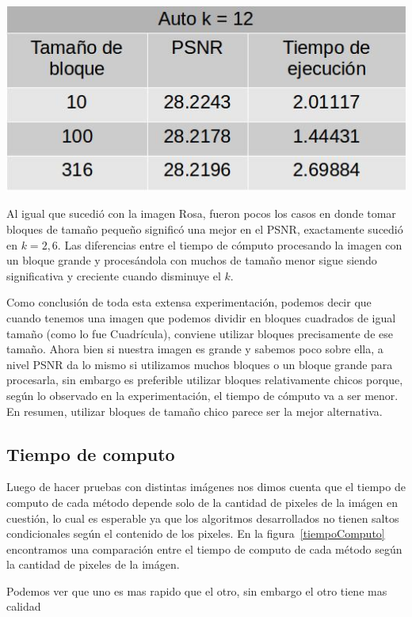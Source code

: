 \documentclass[a4paper]{article}
\begin{document}
\centerline{
\includegraphics[scale=0.5]{imagenes/autok12Tabla.jpg}
}

Al igual que sucedió con la imagen Rosa, fueron pocos los casos en donde tomar bloques de tamaño pequeño significó una mejor en el PSNR, exactamente sucedió en $k = 2, 6$. Las diferencias entre el tiempo de cómputo procesando la imagen con un bloque grande y procesándola con muchos de tamaño menor sigue siendo significativa y creciente cuando disminuye el $k$.
\par Como conclusión de toda esta extensa experimentación, podemos decir que cuando tenemos una imagen que podemos dividir en bloques cuadrados de igual tamaño (como lo fue Cuadrícula), conviene utilizar bloques precisamente de ese tamaño. Ahora bien si nuestra imagen es grande y sabemos poco sobre ella, a nivel PSNR da lo mismo si utilizamos muchos bloques o un bloque grande para procesarla, sin embargo es preferible utilizar bloques relativamente chicos porque, según lo observado en la experimentación, el tiempo de cómputo va a ser menor. En resumen, utilizar bloques de tamaño chico parece ser la mejor alternativa.


\subsection{Tiempo de computo}

Luego de hacer pruebas con distintas imágenes nos dimos cuenta que el tiempo de computo de cada método depende solo de la cantidad de pixeles de la imágen en cuestión, lo cual es esperable ya que los algoritmos desarrollados no tienen saltos condicionales según el contenido de los pixeles. En la figura~\ref{tiempoComputo} encontramos una comparación entre el tiempo de computo de cada método según la cantidad de pixeles de la imágen.

\label{tiempoComputo}

Podemos ver que uno es mas rapido que el otro, sin embargo el otro tiene mas calidad
\end{document}
